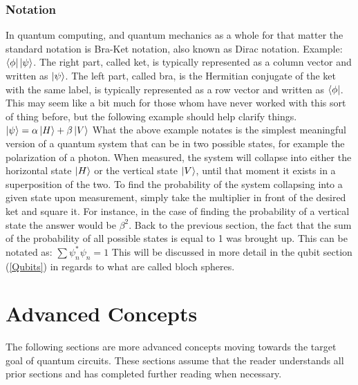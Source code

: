 \documentclass[a4paper]{article}
\begin{document}
\subsubsection{Notation}
In quantum computing, and quantum mechanics as a whole for that matter the standard notation is Bra-Ket notation, also known as Dirac notation. Example: $\left\langle{\phi}\right\vert\left\vert{\psi}\right\rangle$. The right part, called ket, is typically represented as a column vector and written as $\left\vert{\psi}\right\rangle$. The left part, called bra, is the Hermitian conjugate of the ket with the same label, is typically represented as a row vector and written as $\left\langle{\phi}\right\vert$. \newline
\newline
This may seem like a bit much for those whom have never worked with this sort of thing before, but the following example should help clarify things.\newline
$\left\vert{\psi}\right\rangle=\alpha\left\vert{H}\right\rangle + \beta\left\vert{V}\right\rangle$ \newline
What the above example notates is the simplest meaningful version of a quantum system that can be in two possible states, for example the polarization of a photon. When measured, the system will collapse into either the horizontal state $\left\vert{H}\right\rangle$ or the vertical state $\left\vert{V}\right\rangle$, until that moment it exists in a superposition of the two.  To find the probability of the system collapsing into a given state upon measurement, simply take the multiplier in front of the desired ket and square it.  For instance, in the case of finding the probability of a vertical state the answer would be $\beta^2$. \newline
\newline
Back to the previous section, the fact that the sum of the probability of all possible states is equal to 1 was brought up.  This can be notated as:\newline
$\sum\psi^{*}_{n} \psi_{n}=1$ \newline
This will be discussed in more detail in the qubit section (\ref{Qubits}) in regards to what are called bloch spheres. %



\section{Advanced Concepts}
\label{sec:AdvConcepts}
The following sections are more advanced concepts moving towards the target goal of quantum circuits.  These sections assume that the reader understands all prior sections and has completed further reading when necessary. 
\end{document}
